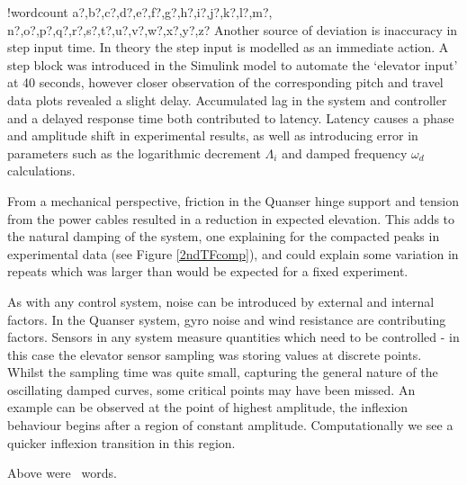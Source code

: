 \documentclass[11pt]{article}
\newcounter{words}
\newenvironment{counted}{%
  \setcounter{words}{0}
  \SearchList!{wordcount}{\stepcounter{words}}
    {a?,b?,c?,d?,e?,f?,g?,h?,i?,j?,k?,l?,m?,
    n?,o?,p?,q?,r?,s?,t?,u?,v?,w?,x?,y?,z?}
  \UndoBoundary{'}
  \SearchOrder{p;}}{%
  \StopSearching}
\begin{document}
\begin{counted}
Another source of deviation is inaccuracy in step input time. In theory
the step input is modelled as an immediate action. A step block was
introduced in the Simulink model to automate the `elevator input' at 40
seconds, however closer observation of the corresponding pitch and
travel data plots revealed a slight delay. Accumulated lag in the system
and controller and a delayed response time both contributed to latency.
Latency causes a phase and amplitude shift in experimental results, as
well as introducing error in parameters such as the logarithmic
decrement \(\Lambda_i\) and damped frequency \(\omega_d\) calculations.

From a mechanical perspective, friction in the Quanser hinge support and
tension from the power cables resulted in a reduction in expected
elevation. This adds to the natural damping of the system, one
explaining for the compacted peaks in experimental data (see Figure
\ref{2ndTFcomp}), and could explain some variation in repeats which was
larger than would be expected for a fixed experiment.

As with any control system, noise can be introduced by external and
internal factors. In the Quanser system, gyro noise and wind resistance
are contributing factors. Sensors in any system measure quantities which
need to be controlled - in this case the elevator sensor sampling was
storing values at discrete points. Whilst the sampling time was quite
small, capturing the general nature of the oscillating damped curves,
some critical points may have been missed. An example can be observed at
the point of highest amplitude, the inflexion behaviour begins after a
region of constant amplitude. Computationally we see a quicker inflexion
transition in this region.

\newpage

\end{counted} %

\newpage
Above were \thewords\ words. %

% 

\printbibliography
\end{document}
